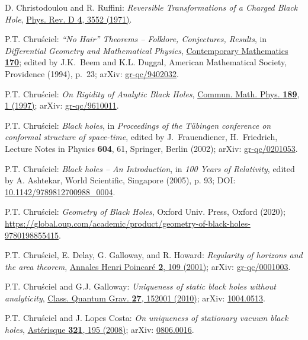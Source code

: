 \begin{thebibliography}{123}
D. Christodoulou and R. Ruffini:
{\em Reversible Transformations of a Charged Black Hole},
\href{https://doi.org/10.1103/PhysRevD.4.3552}{Phys. Rev. D {\bf 4}, 3552 (1971)}.

P.T. Chru\'sciel:
{\em ``No Hair'' Theorems -- Folklore, Conjectures, Results},
in {\em Differential Geometry and Mathematical Physics},
\href{https://doi.org/10.1090/conm/170}{Contemporary Mathematics {\bf 170}};
edited by  J.K.~Beem and K.L. Duggal,
American Mathematical Society, Providence (1994), p.~23;
arXiv: \href{https://arxiv.org/abs/gr-qc/9402032}{gr-qc/9402032}.

P.T. Chru\'sciel: {\em On Rigidity of Analytic Black Holes},
\href{https://doi.org/10.1007/s002200050187}{Commun. Math. Phys. {\bf 189}, 1 (1997)};
arXiv: \href{https://arxiv.org/abs/gr-qc/9610011}{gr-qc/9610011}.

P.T. Chru\'sciel: {\em Black holes},
in {\em Proceedings of the T\"ubingen conference on conformal structure of
space-time}, edited by J.~Frauendiener, H.~Friedrich,
Lecture Notes in Physics {\bf 604}, 61,
Springer, Berlin (2002);
arXiv: \href{https://arxiv.org/abs/gr-qc/0201053}{gr-qc/0201053}.

P.T. Chru\'sciel: {\em Black holes -- An Introduction},
in {\em 100 Years of Relativity}, edited by A. Ashtekar,
World Scientific, Singapore (2005), p. 93;
DOI: \href{https://doi.org/10.1142/9789812700988_0004}{10.1142/9789812700988\_0004}.

P.T. Chru\'sciel: {\em Geometry of Black Holes},
Oxford Univ. Press, Oxford (2020);
{\footnotesize \url{https://global.oup.com/academic/product/geometry-of-black-holes-9780198855415}}.

P.T. Chru\'sciel, E. Delay, G. Galloway, and R. Howard:
{\em Regularity of horizons and the area theorem},
\href{https://doi.org/10.1007/PL00001029}{Annales Henri Poincaré {\bf 2}, 109 (2001)};
arXiv: \href{https://arxiv.org/abs/gr-qc/0001003}{gr-qc/0001003}.

P.T. Chru\'sciel and G.J. Galloway:
{\em Uniqueness of static black holes without analyticity},
\href{https://doi.org/10.1088/0264-9381/27/15/152001}{Class. Quantum Grav. {\bf 27}, 152001 (2010)};
arXiv: \href{https://arxiv.org/abs/1004.0513}{1004.0513}.

P.T. Chru\'sciel and J. Lopes Costa:
{\em On uniqueness of stationary vacuum black holes},
\href{http://www.numdam.org/item/AST_2008__321__195_0/}{Astérisque {\bf 321}, 195 (2008)};
arXiv: \href{https://arxiv.org/abs/0806.0016}{0806.0016}.


\end{thebibliography}
